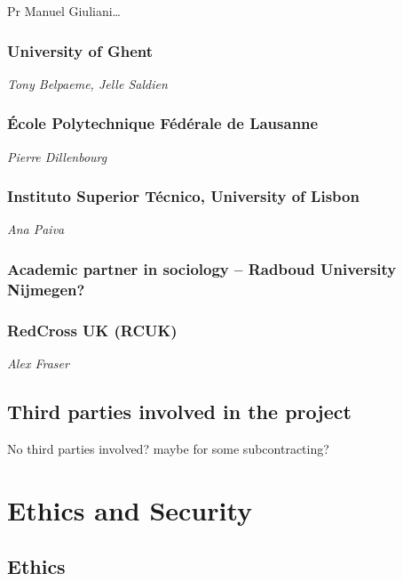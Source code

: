 \documentclass[]{article}
\begin{document}
Pr Manuel Giuliani\ldots{}

\subsubsection{University of Ghent}\label{university-of-ghent}

\emph{Tony Belpaeme, Jelle Saldien}

\subsubsection{École Polytechnique Fédérale de Lausanne}\label{uxe9cole-polytechnique-fuxe9duxe9rale-de-lausanne}

\emph{Pierre Dillenbourg}

\subsubsection{Instituto Superior Técnico, University of Lisbon}\label{instituto-superior-tuxe9cnico-university-of-lisbon}

\emph{Ana Paiva}

\subsubsection{Academic partner in sociology -- Radboud University Nijmegen?}\label{academic-partner-in-sociology-radboud-university-nijmegen}

\subsubsection{RedCross UK (RCUK)}\label{redcross-uk-rcuk}

\emph{Alex Fraser}

\subsection{Third parties involved in the
project}\label{third-parties-involved-in-the-project}

No third parties involved? maybe for some subcontracting?

\section{Ethics and Security}\label{ethics-and-security}

\subsection{Ethics}\label{ethics}
\end{document}
